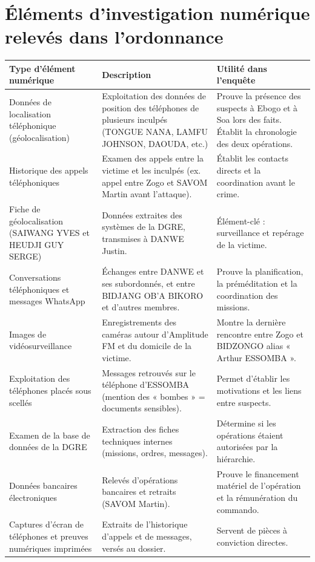 \documentclass[12pt,a4paper]{article}
\begin{document}
\section{Éléments d’investigation numérique relevés dans l’ordonnance}
\renewcommand{\arraystretch}{1.2}
\begin{tabular}{|p{4cm}|p{6cm}|p{5cm}|}
\hline
\textbf{Type d’élément numérique} & \textbf{Description} & \textbf{Utilité dans l’enquête} \\ \hline
Données de localisation téléphonique (géolocalisation) & Exploitation des données de position des téléphones de plusieurs inculpés (TONGUE NANA, LAMFU JOHNSON, DAOUDA, etc.) & Prouve la présence des suspects à Ebogo et à Soa lors des faits. Établit la chronologie des deux opérations. \\ \hline
Historique des appels téléphoniques & Examen des appels entre la victime et les inculpés (ex. appel entre Zogo et SAVOM Martin avant l’attaque). & Établit les contacts directs et la coordination avant le crime. \\ \hline
Fiche de géolocalisation (SAIWANG YVES et HEUDJI GUY SERGE) & Données extraites des systèmes de la DGRE, transmises à DANWE Justin. & Élément-clé : surveillance et repérage de la victime. \\ \hline
Conversations téléphoniques et messages WhatsApp & Échanges entre DANWE et ses subordonnés, et entre BIDJANG OB’A BIKORO et d’autres membres. & Prouve la planification, la préméditation et la coordination des missions. \\ \hline
Images de vidéosurveillance & Enregistrements des caméras autour d’Amplitude FM et du domicile de la victime. & Montre la dernière rencontre entre Zogo et BIDZONGO alias « Arthur ESSOMBA ». \\ \hline
Exploitation des téléphones placés sous scellés & Messages retrouvés sur le téléphone d’ESSOMBA (mention des « bombes » = documents sensibles). & Permet d’établir les motivations et les liens entre suspects. \\ \hline
Examen de la base de données de la DGRE & Extraction des fiches techniques internes (missions, ordres, messages). & Détermine si les opérations étaient autorisées par la hiérarchie. \\ \hline
Données bancaires électroniques & Relevés d’opérations bancaires et retraits (SAVOM Martin). & Prouve le financement matériel de l’opération et la rémunération du commando. \\ \hline
Captures d’écran de téléphones et preuves numériques imprimées & Extraits de l’historique d’appels et de messages, versés au dossier. & Servent de pièces à conviction directes. \\ \hline
\end{tabular}
\end{document}

